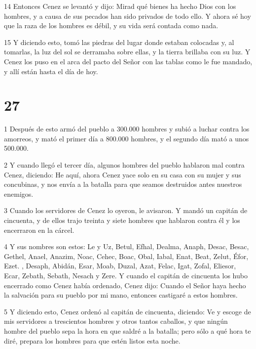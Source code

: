 \par 14 Entonces Cenez se levantó y dijo: Mirad qué bienes ha hecho Dios con los hombres, y a causa de sus pecados han sido privados de todo ello. Y ahora sé hoy que la raza de los hombres es débil, y su vida será contada como nada.

\par 15 Y diciendo esto, tomó las piedras del lugar donde estaban colocadas y, al tomarlas, la luz del sol se derramaba sobre ellas, y la tierra brillaba con su luz. Y Cenez los puso en el arca del pacto del Señor con las tablas como le fue mandado, y allí están hasta el día de hoy.

\chapter{27}

\par 1 Después de esto armó del pueblo a 300.000 hombres y subió a luchar contra los amorreos, y mató el primer día a 800.000 hombres, y el segundo día mató a unos 500.000.

\par 2 Y cuando llegó el tercer día, algunos hombres del pueblo hablaron mal contra Cenez, diciendo: He aquí, ahora Cenez yace solo en su casa con su mujer y sus concubinas, y nos envía a la batalla para que seamos destruidos antes nuestros enemigos.

\par 3 Cuando los servidores de Cenez lo oyeron, le avisaron. Y mandó un capitán de cincuenta, y de ellos trajo treinta y siete hombres que hablaron contra él y los encerraron en la cárcel.

\par 4 Y sus nombres son estos: Le y Uz, Betul, Efhal, Dealma, Anaph, Desac, Besac, Gethel, Anael, Anazim, Noac, Cehec, Boac, Obal, Iabal, Enat, Beat, Zelut, Éfor, Ezet. , Desaph, Abidán, Esar, Moab, Duzal, Azat, Felac, Igat, Zofal, Eliesor, Ecar, Zebath, Sebath, Nesach y Zere. Y cuando el capitán de cincuenta los hubo encerrado como Cenez había ordenado, Cenez dijo: Cuando el Señor haya hecho la salvación para su pueblo por mi mano, entonces castigaré a estos hombres.

\par 5 Y diciendo esto, Cenez ordenó al capitán de cincuenta, diciendo: Ve y escoge de mis servidores a trescientos hombres y otros tantos caballos, y que ningún hombre del pueblo sepa la hora en que saldré a la batalla; pero sólo a qué hora te diré, prepara los hombres para que estén listos esta noche.

